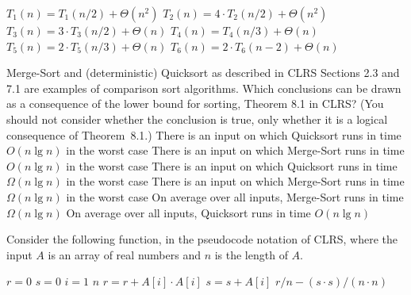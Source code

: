 \optionsstart
\answer $T_1(n) = T_1(n/2) + \Theta(n^2)$ \correct
\answer $T_2(n) = 4\cdot T_2(n/2) + \Theta(n^2)$
\answer $T_3(n) = 3\cdot T_3(n/2) + \Theta(n)$  \correct
\answer $T_4(n) = T_4(n/3) + \Theta(n)$ \correct
\answer $T_5(n) = 2\cdot T_5(n/3) + \Theta(n)$ \correct
\answer $T_6(n) = 2\cdot T_6(n-2) + \Theta(n)$
\optionsend





{\sc Merge-Sort} and (deterministic) {\sc Quicksort} as described in CLRS Sections 2.3 and 7.1 are examples of comparison sort algorithms.
Which conclusions can be drawn as a consequence of the lower bound for sorting, Theorem 8.1 in CLRS?
(You should not consider whether the conclusion is true, only whether it is a logical consequence of Theorem~8.1.)
\multipleanswers
\optionsstart
\answer There is an input on which {\sc Quicksort} runs in time $O(n \lg n)$ in the worst case
\answer There is an input on which {\sc Merge-Sort} runs in time $O(n \lg n)$ in the worst case
\answer There is an input on which {\sc Quicksort} runs in time $\Omega(n \lg n)$ in the worst case \correct
\answer There is an input on which {\sc Merge-Sort} runs in time $\Omega(n \lg n)$ in the worst case \correct
\answer On average over all inputs, {\sc Merge-Sort} runs in time $\Omega(n \lg n)$
\answer On average over all inputs, {\sc Quicksort} runs in time $O(n \lg n)$
\optionsend






Consider the following function, in the pseudocode notation of CLRS, where the input $A$ is an array of real numbers and $n$ is the length of $A$.
\begin{codebox}
  \li $r = 0$
  \li $s = 0$
  \li \For $i = 1$ \To $n$
  \li \Do $r = r + A[i] \cdot A[i]$
  \li $s = s + A[i]$ \End
  \li \Return $r / n - (s\cdot s)/(n\cdot n)$
\end{codebox}


